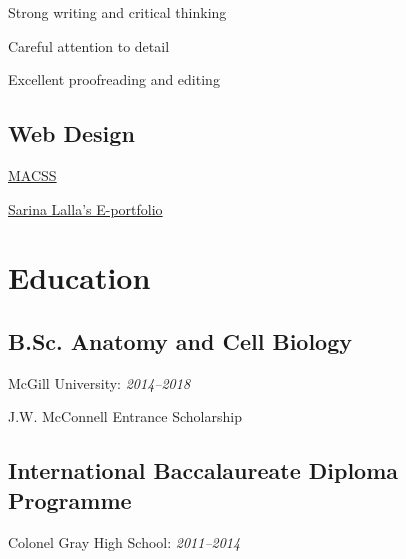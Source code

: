 \documentclass[%
	12pt,%
	]
	{article}
\begin{document}
Strong writing and critical thinking

Careful attention to detail

Excellent proofreading and editing

\subsection*{Web Design}
\href{https://jidicula.github.io/macssmcgill/index.html}{MACSS}

\href{https://sarinalalla.github.io/}{Sarina Lalla's E-portfolio}

\section*{Education}
\subsection*{B.Sc. Anatomy and Cell Biology}
McGill University: \emph{2014--2018}

J.W. McConnell Entrance Scholarship

\subsection*{International Baccalaureate Diploma Programme}
Colonel Gray High School: \emph{2011--2014}
\end{document}
